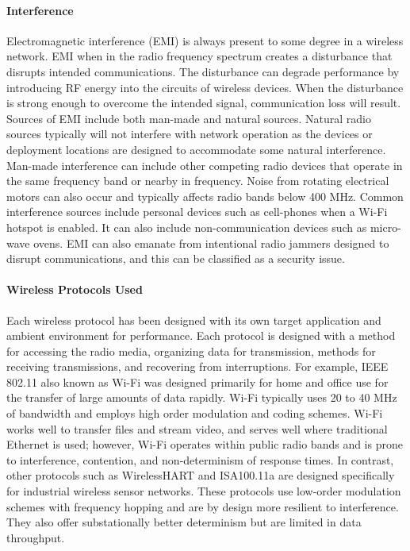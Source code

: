 \paragraph{Interference} Electromagnetic interference (EMI) is always present to some degree in a wireless network.  EMI when in the radio frequency spectrum creates a disturbance that disrupts intended communications.  The disturbance can degrade performance by introducing RF energy into the circuits of wireless devices.  When the disturbance is strong enough to overcome the intended signal, communication loss will result.  Sources of EMI include both man-made and natural sources.  Natural radio sources typically will not interfere with network operation as the devices or deployment locations are designed to accommodate some natural interference.  Man-made interference can include other competing radio devices that operate in the same frequency band or nearby in frequency.  Noise from rotating electrical motors can also occur and typically affects radio bands below 400 MHz.  Common interference sources include personal devices such as cell-phones when a Wi-Fi hotspot is enabled.  It can also include non-communication devices such as micro-wave ovens.  EMI can also emanate from intentional radio jammers designed to disrupt communications, and this can be classified as a security issue.

\paragraph{Wireless Protocols Used} Each wireless protocol has been designed with its own target application and ambient environment for performance.  Each protocol is designed with a method for accessing the radio media, organizing data for transmission, methods for receiving transmissions, and recovering from interruptions.   For example, IEEE 802.11 also known as Wi-Fi was designed primarily for home and office use for the transfer of large amounts of data rapidly.  Wi-Fi typically uses 20 to 40 MHz of bandwidth and employs high order modulation and coding schemes.  Wi-Fi works well to transfer files and stream video, and serves well where traditional Ethernet is used; however, Wi-Fi operates within public radio bands and is prone to interference, contention, and non-determinism of response times.  In contrast, other protocols such as WirelessHART and ISA100.11a are designed specifically for industrial wireless sensor networks.  These protocols use low-order modulation schemes with frequency hopping and are by design more resilient to interference.  They also offer substationally better determinism but are limited in data throughput.

